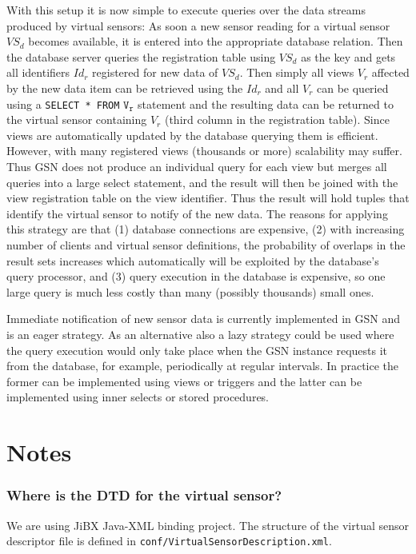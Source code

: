 With this setup it is now simple to execute queries over the data streams
produced by virtual sensors: As soon a new sensor reading for a virtual sensor
$VS_d$ becomes available, it is entered into the appropriate database relation.
Then the database server queries the registration table using $VS_d$ as the key
and gets all identifiers $Id_r$ registered for new data of $VS_d$. Then simply
all views $V_r$ affected by the new data item can be retrieved using the $Id_r$
and all $V_r$ can be queried using a \texttt{SELECT * FROM} $\mathtt{V_r}$
statement and the resulting data can be returned to the virtual sensor
containing $V_r$ (third column in the registration table). Since views are
automatically updated by the database querying them is efficient. However, with
many registered views (thousands or more) scalability may suffer. Thus GSN does
not produce an individual query for each view but merges all queries into a
large select statement, and the result will then be joined with the view
registration table on the view identifier. Thus the result will hold tuples
that identify the virtual sensor to notify of the new data.  The reasons for
applying this strategy are that (1) database connections are expensive, (2)
with increasing number of clients and virtual sensor definitions, the
probability of overlaps in the result sets increases which automatically will
be exploited by the database's query processor, and (3) query execution in the
database is expensive, so one large query is much less costly than many
(possibly thousands) small ones.

Immediate notification of new sensor data is currently implemented in GSN and
is an eager strategy. As an alternative also a lazy strategy could be used
where the query execution would only take place when the GSN instance requests
it from the database, for example, periodically at regular intervals. In
practice the former can be implemented using views or triggers and the latter
can be implemented using inner selects or stored procedures.

\section{Notes}


\subsubsection{Where is the DTD for the virtual sensor?}
We are using JiBX Java-XML binding project. The structure of the virtual sensor descriptor file is defined in \texttt{conf/VirtualSensorDescription.xml}.

